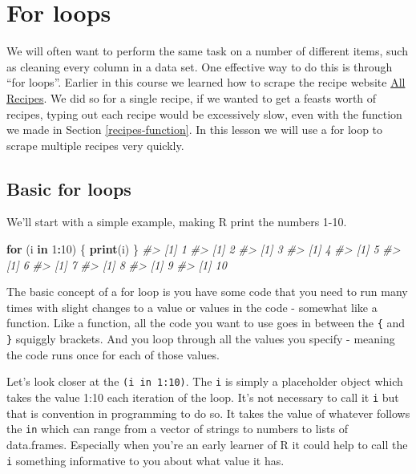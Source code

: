 \documentclass[
  12pt,
]{book}
\newenvironment{Shaded}{\begin{snugshade}}{\end{snugshade}}
\newcommand{\CommentTok}[1]{\textcolor[rgb]{0.56,0.35,0.01}{\textit{#1}}}
\newcommand{\ControlFlowTok}[1]{\textcolor[rgb]{0.13,0.29,0.53}{\textbf{#1}}}
\newcommand{\DecValTok}[1]{\textcolor[rgb]{0.00,0.00,0.81}{#1}}
\newcommand{\KeywordTok}[1]{\textcolor[rgb]{0.13,0.29,0.53}{\textbf{#1}}}
\newcommand{\NormalTok}[1]{#1}
\newcommand{\OperatorTok}[1]{\textcolor[rgb]{0.81,0.36,0.00}{\textbf{#1}}}
\begin{document}
\hypertarget{for-loops}{%
\chapter{For loops}\label{for-loops}}

We will often want to perform the same task on a number of different items, such as cleaning every column in a data set. One effective way to do this is through ``for loops''. Earlier in this course we learned how to scrape the recipe website \href{https://www.allrecipes.com/}{All Recipes}. We did so for a single recipe, if we wanted to get a feasts worth of recipes, typing out each recipe would be excessively slow, even with the function we made in Section \ref{recipes-function}. In this lesson we will use a for loop to scrape multiple recipes very quickly.

\hypertarget{basic-for-loops}{%
\section{Basic for loops}\label{basic-for-loops}}

We'll start with a simple example, making R print the numbers 1-10.

\begin{Shaded}
\begin{Highlighting}[]
\ControlFlowTok{for}\NormalTok{ (i }\ControlFlowTok{in} \DecValTok{1}\OperatorTok{:}\DecValTok{10}\NormalTok{) \{}
   \KeywordTok{print}\NormalTok{(i)}
\NormalTok{\}}
\CommentTok{\#> [1] 1}
\CommentTok{\#> [1] 2}
\CommentTok{\#> [1] 3}
\CommentTok{\#> [1] 4}
\CommentTok{\#> [1] 5}
\CommentTok{\#> [1] 6}
\CommentTok{\#> [1] 7}
\CommentTok{\#> [1] 8}
\CommentTok{\#> [1] 9}
\CommentTok{\#> [1] 10}
\end{Highlighting}
\end{Shaded}

The basic concept of a for loop is you have some code that you need to run many times with slight changes to a value or values in the code - somewhat like a function. Like a function, all the code you want to use goes in between the \texttt{\{} and \texttt{\}} squiggly brackets. And you loop through all the values you specify - meaning the code runs once for each of those values.

Let's look closer at the \texttt{(i\ in\ 1:10)}. The \texttt{i} is simply a placeholder object which takes the value 1:10 each iteration of the loop. It's not necessary to call it \texttt{i} but that is convention in programming to do so. It takes the value of whatever follows the \texttt{in} which can range from a vector of strings to numbers to lists of data.frames. Especially when you're an early learner of R it could help to call the \texttt{i} something informative to you about what value it has.
\end{document}
